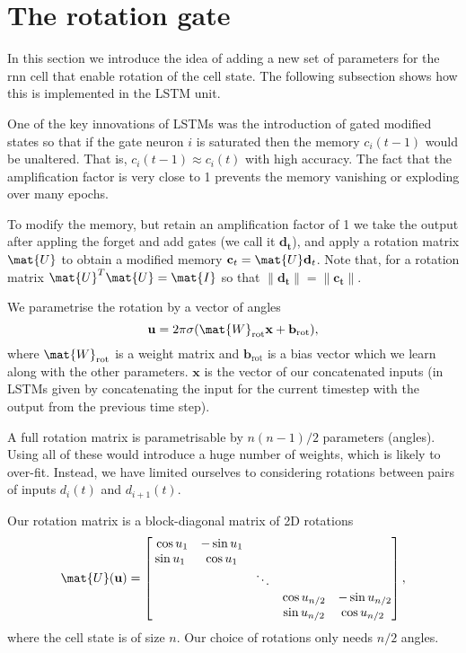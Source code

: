 \documentclass{article}
\begin{document}
\section{The rotation gate}
\label{rot:sec:rotation-gate}

In this section we introduce the idea of adding a new set of parameters for the \ac{rnn} cell that enable rotation of the cell state. The following subsection shows how this is implemented in the \ac{LSTM} unit.

One of the key innovations of \acp{LSTM} was the introduction of gated modified states so that if the gate neuron $i$ is saturated then the memory $c_i(t-1)$ would be unaltered. That is, $c_i(t-1) \approx c_i(t)$ with high accuracy. The fact that the amplification factor is very close to 1 prevents the memory vanishing or exploding over many epochs.

To modify the memory, but retain an amplification factor of 1 we take the output after appling the forget and add gates (we call it $\mathbf{d_t}$), and apply a rotation matrix $\mat{U}$ to obtain a modified memory $\mathbf{c}_t=\mat{U}\mathbf{d}_t$. Note that, for a rotation matrix $\mat{U}^T\mat{U} = \mat{I}$ so that $\lVert \mathbf{d_t} \rVert = \lVert \mathbf{c_t} \rVert$.

We parametrise the rotation by a vector of angles
\begin{equation}
	\mathbf{u} = 2\pi\sigma(\mat{W}_{\text{rot}} \mathbf{x} + \mathbf{b}_\text{rot}),
\end{equation}
where $\mat{W}_{\text{rot}}$ is a weight matrix and $\mathbf{b}_\text{rot}$ is a bias vector which we learn along with the other parameters. $\mathbf{x}$ is the vector of our concatenated inputs (in \acp{LSTM} given by concatenating the input for the current timestep with the output from the previous time step).

A full rotation matrix is parametrisable by $n(n-1)/2$ parameters (angles). Using all of these would introduce a huge number of weights, which is likely to over-fit. Instead, we have limited ourselves to considering rotations between pairs of inputs $d_i(t)$ and $d_{i+1}(t)$.

Our rotation matrix is a block-diagonal matrix of 2D rotations \begin{equation}
\label{eq:umat}
	\mat{U}(\mathbf{u}) = \begin{bmatrix}\
		\cos u_1 & -\sin u_1 & &  &  \\
		\sin u_1 & \cos u_1 &  &  &  \\
		 &  & \ddots &  &  \\
		 & &  & \cos u_{n/2} & -\sin u_{n/2} \\
		 &  &  & \sin u_{n/2} & \cos u_{n/2} \
	\end{bmatrix},
\end{equation}
where the cell state is of size $n$. Our choice of rotations only needs $n/2$ angles.
\end{document}
